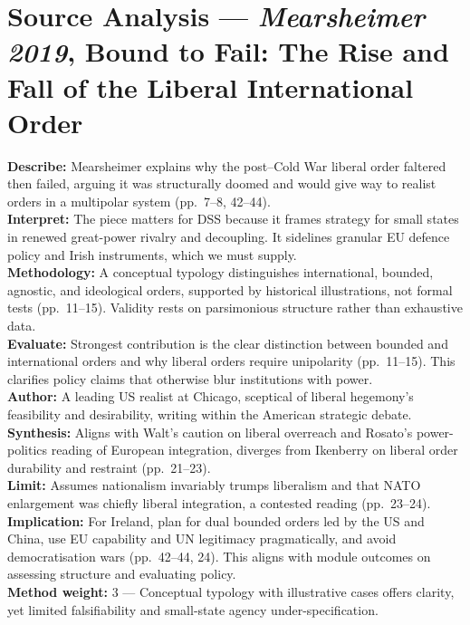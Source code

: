 \parencite{MEARSHEIMER_2019}

\section*{Source Analysis — \textit{Mearsheimer 2019}, Bound to Fail: The Rise and Fall of the Liberal International Order}

\textbf{Describe:} Mearsheimer explains why the post–Cold War liberal order faltered then failed, arguing it was structurally doomed and would give way to realist orders in a multipolar system (pp.~7--8, 42--44).\\
\textbf{Interpret:} The piece matters for DSS because it frames strategy for small states in renewed great-power rivalry and decoupling. It sidelines granular EU defence policy and Irish instruments, which we must supply.\\
\textbf{Methodology:} A conceptual typology distinguishes international, bounded, agnostic, and ideological orders, supported by historical illustrations, not formal tests (pp.~11--15). Validity rests on parsimonious structure rather than exhaustive data.\\
\textbf{Evaluate:} Strongest contribution is the clear distinction between bounded and international orders and why liberal orders require unipolarity (pp.~11--15). This clarifies policy claims that otherwise blur institutions with power.\\
\textbf{Author:} A leading US realist at Chicago, sceptical of liberal hegemony’s feasibility and desirability, writing within the American strategic debate.\\
\textbf{Synthesis:} Aligns with Walt’s caution on liberal overreach and Rosato’s power-politics reading of European integration, diverges from Ikenberry on liberal order durability and restraint (pp.~21--23).\\
\textbf{Limit:} Assumes nationalism invariably trumps liberalism and that NATO enlargement was chiefly liberal integration, a contested reading (pp.~23--24).\\
\textbf{Implication:} For Ireland, plan for dual bounded orders led by the US and China, use EU capability and UN legitimacy pragmatically, and avoid democratisation wars (pp.~42--44, 24). This aligns with module outcomes on assessing structure and evaluating policy.\\

\textbf{Method weight:} 3 — Conceptual typology with illustrative cases offers clarity, yet limited falsifiability and small-state agency under-specification.\\

